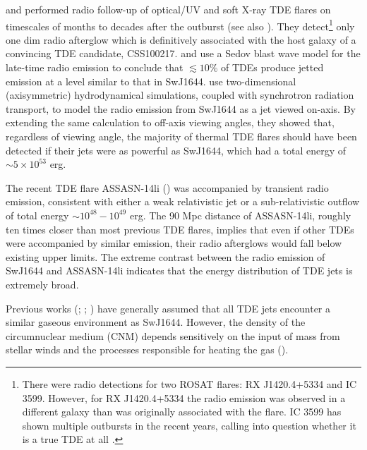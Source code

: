 \documentclass[usenatbib,fleqn]{mnras}
\begin{document}
\citet{Bower+2013} and \citet{van-Velzen+2013} performed radio
follow-up of optical/UV and soft X-ray TDE flares on timescales of
months to decades after the outburst (see also
\citealt{Arcavi+2014}). They detect\footnote{There were radio
  detections for two ROSAT flares: RX J1420.4+5334 and IC
  3599. However, for RX J1420.4+5334 the radio emission was observed
  in a different galaxy than was originally associated with the flare.
  IC 3599 has shown multiple outbursts in the recent years, calling
  into question whether it is a true TDE at all \citep{Campana+2015}.}
only one dim radio afterglow which is definitively associated with the
host galaxy of a convincing TDE candidate, CSS100217.
\citet{Bower+2013} and \citet{van-Velzen+2013} use a Sedov blast wave
model for the late-time radio emission to conclude that $\lesssim
10\%$ of TDEs produce jetted emission at a level similar to that in
SwJ1644.  \citet{Mimica+2015} use two-dimensional (axisymmetric)
hydrodynamical simulations, coupled with synchrotron radiation
transport, to model the radio emission from SwJ1644 as a jet viewed
on-axis.  By extending the same calculation to off-axis viewing
angles, they showed that, regardless of viewing angle, the majority of
thermal TDE flares should have been detected if their jets were as
powerful as SwJ1644, which had a total energy of $\sim 5\times
10^{53}$ erg.


The recent TDE flare ASSASN-14li (\citealt{Holoien+2016a}) was
accompanied by transient radio emission, consistent with either a weak
relativistic jet \citep{van-Velzen+2015} or a sub-relativistic outflow
\citep{Alexander+2015,Krolik+16} of total energy $\sim
10^{48}-10^{49}$ erg.  The 90 Mpc distance of ASSASN-14li, roughly ten
times closer than most previous TDE flares, implies that even if other
TDEs were accompanied by similar emission, their radio afterglows
would fall below existing upper limits.  The extreme contrast between
the radio emission of SwJ1644 and ASSASN-14li indicates that the
energy distribution of TDE jets is extremely broad.

Previous works (\citealt{Bower+2013}; \citealt{van-Velzen+2013};
\citealt{Mimica+2015}) have generally assumed that all TDE jets
encounter a similar gaseous environment as SwJ1644.  However, the
density of the circumnuclear medium (CNM) depends sensitively on the
input of mass from stellar winds and the processes responsible for
heating the gas (\citealt{Quataert2004,Generozov+2015}). 
\end{document}
